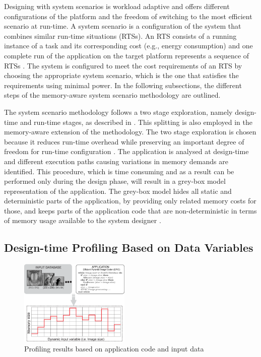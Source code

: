 \documentclass[a4paper,conference]{IEEEtran}
\begin{document}
Designing with system scenarios is workload adaptive and offers different configurations of the platform and the freedom of switching to the most efficient scenario at run-time. A system scenario is a configuration of the system that combines similar run-time situations (RTSs). An RTS consists of a running instance of a task and its corresponding cost (e.g., energy consumption) and one complete run of the application on the target platform represents a sequence of RTSs \cite{Elena2010}. The system is configured to meet the cost requirements of an RTS by choosing the appropriate system scenario, which is the one that satisfies the requirements using minimal power. In the following subsections, the different steps of the memory-aware system scenario methodology are outlined. 

The system scenario methodology follows a two stage exploration, namely design-time and run-time stages, as described in \cite{Gheorghita2007}. This splitting is also employed in the memory-aware extension of the methodology. The two stage exploration is chosen because it reduces run-time overhead while preserving an important degree of freedom for run-time configuration \cite{tcm}. The application is analysed at design-time and different execution paths causing variations in memory demands are identified. This procedure, which is time consuming and as a result can be performed only during the design phase, will result in a grey-box model representation of the application. The grey-box model hides all static and deterministic parts of the application, by providing only related memory costs for those, and keeps parts of the application code that are non-deterministic in terms of memory usage available to the system designer \cite{graybox}. 


\subsection{Design-time Profiling Based on Data Variables}

\begin{figure}[!t]
\centering
\includegraphics[width=0.47\textwidth]{Images/profiling2.eps}
\caption{Profiling results based on application code and input data}
\label{fig:profiling}
\end{figure}
\end{document}
